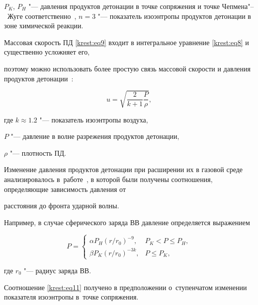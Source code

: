 $P_K$, $P_H$ "--- давления продуктов детонации в точке сопряжения и точке Чепмена"--~Жуге соответственно~\cite{krest:bib3}, $n=3$ "--- показатель изоэнтропы продуктов детонации в зоне химической реакции.



Массовая скорость ПД \eqref{krest:eq9} входит в интегральное уравнение \eqref{krest:eq8} и существенно усложняет его,

поэтому можно использовать более простую связь массовой скорости и давления продуктов детонации~\cite{krest:bib4}:

\begin{equation}

\label{krest:eq10}

u=\sqrt {\frac{2}{k+1} \frac{P}{\rho}},

\end{equation}

где $k\approx 1.2$ "--- показатель изоэнтропы воздуха, 

$P$ "--- давление в волне разрежения продуктов детонации, 

$\rho$ "--- плотность ПД. 

Изменение давления продуктов детонации при расширении их в газовой среде анализировалось в~работе~\cite{krest:bib3}, в которой были получены соотношения, определяющие зависимость давления от

расстояния до фронта ударной волны. 

Например, в случае сферического заряда ВВ давление определяется выражением

\begin{equation}

\label{krest:eq11}

P =

\left\{

\begin{array}{ll}

 \alpha P_H ( {r}/{r_0} )^{-9}, & P_K < P\le P_H, \\

 \beta P_K ( {r}/{r_0} )^{-3 k}, & P\le P_K,

\end{array}

\right.

\end{equation}

где $r_0$ "--- радиус заряда ВВ. 

Соотношение \eqref{krest:eq11} получено в предположении о~ступенчатом изменении показателя изоэнтропы в~точке сопряжения.




